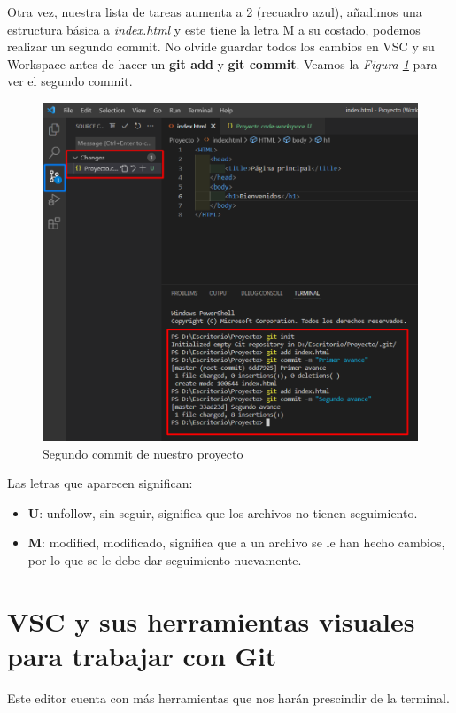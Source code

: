 Otra vez, nuestra lista de tareas aumenta a 2 (recuadro azul), añadimos una estructura básica a \textit{index.html} y este tiene la letra M a su costado, podemos realizar un segundo commit. No olvide guardar todos los cambios en VSC y su Workspace antes de hacer un \textbf{git add} y \textbf{git commit}. Veamos la \textit{Figura \ref{fig: 16}} para ver el segundo commit.
\begin{figure}[H]
    \centering
    \caption{Segundo commit de nuestro proyecto}
    \label{fig: 16}
    \includegraphics[width=12cm]{capturas/segundo commit.png}
\end{figure}

Las letras que aparecen significan:
\begin{itemize}
    \item \textbf{U}: unfollow, sin seguir, significa que los archivos no tienen seguimiento.
    \item \textbf{M}: modified, modificado, significa que a un archivo se le han hecho cambios, por lo que se le debe dar seguimiento nuevamente.
\end{itemize}



\section{VSC y sus herramientas visuales para trabajar con Git}
\hspace{0.55cm}Este editor cuenta con más herramientas que nos harán prescindir de la terminal.


